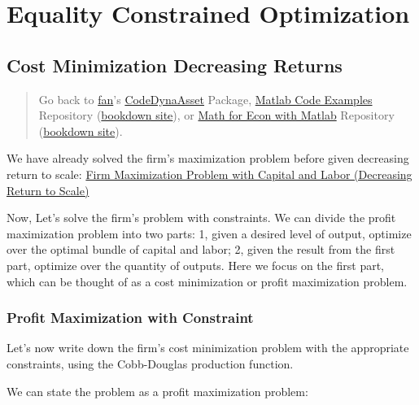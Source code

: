 \documentclass[
]{book}
\begin{document}
\hypertarget{equality-constrained-optimization}{%
\chapter{Equality Constrained Optimization}\label{equality-constrained-optimization}}

\hypertarget{cost-minimization-decreasing-returns}{%
\section{Cost Minimization Decreasing Returns}\label{cost-minimization-decreasing-returns}}

\begin{quote}
Go back to \href{http://fanwangecon.github.io/}{fan}'s \href{https://fanwangecon.github.io/CodeDynaAsset/}{CodeDynaAsset} Package, \href{https://fanwangecon.github.io/M4Econ/}{Matlab Code Examples} Repository (\href{https://fanwangecon.github.io/M4Econ/bookdown}{bookdown site}), or \href{https://fanwangecon.github.io/Math4Econ/}{Math for Econ with Matlab} Repository (\href{https://fanwangecon.github.io/Math4Econ/bookdown}{bookdown site}).
\end{quote}

We have already solved the firm's maximization problem before given
decreasing return to scale: \href{https://fanwangecon.github.io/Math4Econ/matrix_application/KL_borrowhire_firm.html}{Firm Maximization Problem with Capital and
Labor (Decreasing Return to
Scale)}

Now, Let's solve the firm's problem with constraints. We can divide the
profit maximization problem into two parts: 1, given a desired level of
output, optimize over the optimal bundle of capital and labor; 2, given
the result from the first part, optimize over the quantity of outputs.
Here we focus on the first part, which can be thought of as a cost
minimization or profit maximization problem.

\hypertarget{profit-maximization-with-constraint}{%
\subsection{Profit Maximization with Constraint}\label{profit-maximization-with-constraint}}

Let's now write down the firm's cost minimization problem with the
appropriate constraints, using the Cobb-Douglas production function.

We can state the problem as a profit maximization problem:
\end{document}
